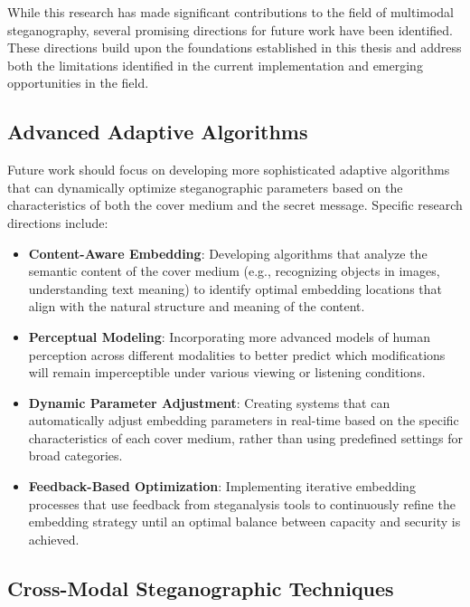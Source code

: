 \documentclass[12pt, a4paper, oneside]{book}
\begin{document}
While this research has made significant contributions to the field of multimodal steganography, several promising directions for future work have been identified. These directions build upon the foundations established in this thesis and address both the limitations identified in the current implementation and emerging opportunities in the field.

\subsection{Advanced Adaptive Algorithms}

Future work should focus on developing more sophisticated adaptive algorithms that can dynamically optimize steganographic parameters based on the characteristics of both the cover medium and the secret message. Specific research directions include:

\begin{itemize}[leftmargin=*]
    \item \textbf{Content-Aware Embedding}: Developing algorithms that analyze the semantic content of the cover medium (e.g., recognizing objects in images, understanding text meaning) to identify optimal embedding locations that align with the natural structure and meaning of the content.

    \item \textbf{Perceptual Modeling}: Incorporating more advanced models of human perception across different modalities to better predict which modifications will remain imperceptible under various viewing or listening conditions.

    \item \textbf{Dynamic Parameter Adjustment}: Creating systems that can automatically adjust embedding parameters in real-time based on the specific characteristics of each cover medium, rather than using predefined settings for broad categories.

    \item \textbf{Feedback-Based Optimization}: Implementing iterative embedding processes that use feedback from steganalysis tools to continuously refine the embedding strategy until an optimal balance between capacity and security is achieved.
\end{itemize}

\subsection{Cross-Modal Steganographic Techniques}
\end{document}
